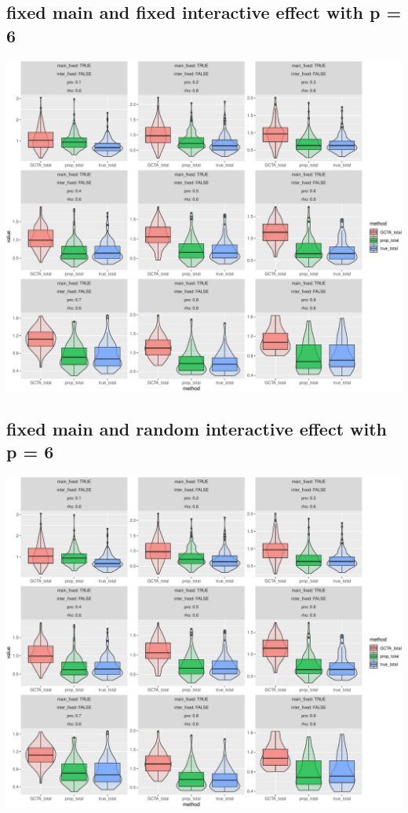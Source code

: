 \documentclass[]{article}
\begin{document}
\subsection{fixed main and fixed interactive effect with p =
6}\label{fixed-main-and-fixed-interactive-effect-with-p-6}

\includegraphics{Simulation_report_chi_resamle_files/figure-latex/fixed fixed p 6-1.pdf}

\subsection{fixed main and random interactive effect with p =
6}\label{fixed-main-and-random-interactive-effect-with-p-6}

\includegraphics{Simulation_report_chi_resamle_files/figure-latex/fixed random p 6-1.pdf}
\end{document}
